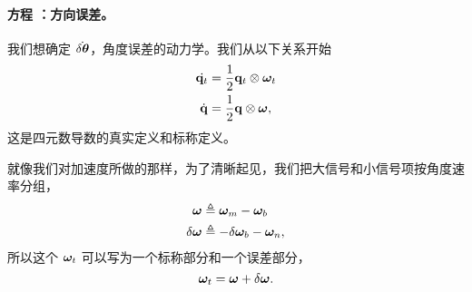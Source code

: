 \paragraph{方程 ：方向误差。}


我们想确定 $\dot{\delta{\bm \theta}}$，角度误差的动力学。我们从以下关系开始
%
%
\begin{align}
\dot{{\bf q}_t} &= \frac{1}{2}{\bf q}_t\otimes{\bm \omega}_t \\
\dot{{\bf q}} &= \frac{1}{2}{\bf q}\otimes{\bm \omega} ,
\end{align}%
%
这是四元数导数的真实定义和标称定义。

就像我们对加速度所做的那样，为了清晰起见，我们把大信号和小信号项按角度速率分组，
%
%
\begin{align}
{\bm \omega} &\triangleq {\bm \omega}_m - {\bm \omega}_b \label{equ:nomangrate}\\
\delta{\bm \omega} &\triangleq -\delta{\bm \omega}_b - {\bm \omega}_n, \label{equ:pertangrate}
\end{align}%
%
所以这个 ${\bm \omega}_t$ 可以写为一个标称部分和一个误差部分，
%
\begin{equation}
{\bm \omega}_t = {\bm \omega} + \delta{\bm \omega} .
\end{equation}%


